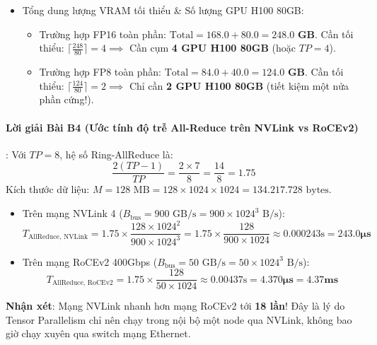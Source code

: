 \begin{itemize}
  \item[c)] Tổng dung lượng VRAM tối thiểu \& Số lượng GPU H100 80GB:
  \begin{itemize}
    \item Trường hợp FP16 toàn phần: $\text{Total} = 168.0 + 80.0 = \mathbf{248.0\text{ GB}}$.
    Cần tối thiểu: $\lceil \frac{248}{80} \rceil = 4 \implies$ Cần cụm \textbf{4 GPU H100 80GB} (hoặc $TP=4$).
    \item Trường hợp FP8 toàn phần: $\text{Total} = 84.0 + 40.0 = \mathbf{124.0\text{ GB}}$.
    Cần tối thiểu: $\lceil \frac{124}{80} \rceil = 2 \implies$ Chỉ cần \textbf{2 GPU H100 80GB} (tiết kiệm một nửa phần cứng!).
  \end{itemize}
\end{itemize}

\paragraph{Lời giải Bài B4 (Ước tính độ trễ All-Reduce trên NVLink vs RoCEv2)}:
Với $TP = 8$, hệ số Ring-AllReduce là:
\begin{equation*}
\frac{2(TP - 1)}{TP} = \frac{2 \times 7}{8} = \frac{14}{8} = 1.75
\end{equation*}
Kích thước dữ liệu: $M = 128\text{ MB} = 128 \times 1024 \times 1024 = 134.217.728\text{ bytes}$.
\begin{itemize}
  \item[a)] Trên mạng NVLink 4 ($B_{\text{bus}} = 900\text{ GB/s} = 900 \times 1024^3\text{ B/s}$):
  \begin{equation*}
  T_{\text{AllReduce, NVLink}} = 1.75 \times \frac{128 \times 1024^2}{900 \times 1024^3} = 1.75 \times \frac{128}{900 \times 1024} \approx 0.000243\text{s} = \mathbf{243.0\mu\text{s}}
  \end{equation*}
  \item[b)] Trên mạng RoCEv2 400Gbps ($B_{\text{bus}} = 50\text{ GB/s} = 50 \times 1024^3\text{ B/s}$):
  \begin{equation*}
  T_{\text{AllReduce, RoCEv2}} = 1.75 \times \frac{128}{50 \times 1024} \approx 0.00437\text{s} = \mathbf{4.370\mu\text{s}} = \mathbf{4.37\text{ms}}
  \end{equation*}
\end{itemize}
\textbf{Nhận xét}: Mạng NVLink nhanh hơn mạng RoCEv2 tới \textbf{18 lần}! Đây là lý do Tensor Parallelism chỉ nên chạy trong nội bộ một node qua NVLink, không bao giờ chạy xuyên qua switch mạng Ethernet.

